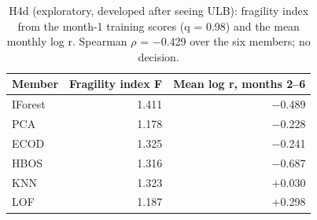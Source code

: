 \begin{table}[t]
\centering
\small
\caption{H4d (exploratory, developed after seeing ULB): fragility index from the month-1 training scores (q = 0.98) and the mean monthly log r. Spearman $\rho$ = −0.429 over the six members; no decision.}
\label{tab:h4d}
\begin{tabular}{lrr}
\toprule
Member & Fragility index F & Mean log r, months 2–6 \\
\midrule
IForest & 1.411 & −0.489 \\
PCA & 1.178 & −0.228 \\
ECOD & 1.325 & −0.241 \\
HBOS & 1.316 & −0.687 \\
KNN & 1.323 & +0.030 \\
LOF & 1.187 & +0.298 \\
\bottomrule
\end{tabular}
\end{table}
